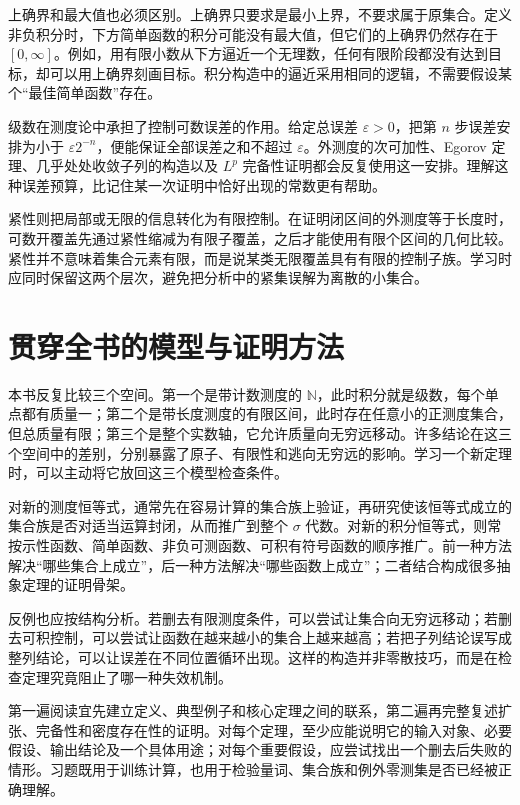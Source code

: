 上确界和最大值也必须区别。上确界只要求是最小上界，不要求属于原集合。定义非负积分时，下方简单函数的积分可能没有最大值，但它们的上确界仍然存在于 $[0,\infty]$。例如，用有限小数从下方逼近一个无理数，任何有限阶段都没有达到目标，却可以用上确界刻画目标。积分构造中的逼近采用相同的逻辑，不需要假设某个“最佳简单函数”存在。

级数在测度论中承担了控制可数误差的作用。给定总误差 $\varepsilon>0$，把第 $n$ 步误差安排为小于 $\varepsilon2^{-n}$，便能保证全部误差之和不超过 $\varepsilon$。外测度的次可加性、Egorov 定理、几乎处处收敛子列的构造以及 $L^p$ 完备性证明都会反复使用这一安排。理解这种误差预算，比记住某一次证明中恰好出现的常数更有帮助。

紧性则把局部或无限的信息转化为有限控制。在证明闭区间的外测度等于长度时，可数开覆盖先通过紧性缩减为有限子覆盖，之后才能使用有限个区间的几何比较。紧性并不意味着集合元素有限，而是说某类无限覆盖具有有限的控制子族。学习时应同时保留这两个层次，避免把分析中的紧集误解为离散的小集合。

\section{贯穿全书的模型与证明方法}
本书反复比较三个空间。第一个是带计数测度的 $\mathbb N$，此时积分就是级数，每个单点都有质量一；第二个是带长度测度的有限区间，此时存在任意小的正测度集合，但总质量有限；第三个是整个实数轴，它允许质量向无穷远移动。许多结论在这三个空间中的差别，分别暴露了原子、有限性和逃向无穷远的影响。学习一个新定理时，可以主动将它放回这三个模型检查条件。

对新的测度恒等式，通常先在容易计算的集合族上验证，再研究使该恒等式成立的集合族是否对适当运算封闭，从而推广到整个 $\sigma$ 代数。对新的积分恒等式，则常按示性函数、简单函数、非负可测函数、可积有符号函数的顺序推广。前一种方法解决“哪些集合上成立”，后一种方法解决“哪些函数上成立”；二者结合构成很多抽象定理的证明骨架。

反例也应按结构分析。若删去有限测度条件，可以尝试让集合向无穷远移动；若删去可积控制，可以尝试让函数在越来越小的集合上越来越高；若把子列结论误写成整列结论，可以让误差在不同位置循环出现。这样的构造并非零散技巧，而是在检查定理究竟阻止了哪一种失效机制。

第一遍阅读宜先建立定义、典型例子和核心定理之间的联系，第二遍再完整复述扩张、完备性和密度存在性的证明。对每个定理，至少应能说明它的输入对象、必要假设、输出结论及一个具体用途；对每个重要假设，应尝试找出一个删去后失败的情形。习题既用于训练计算，也用于检验量词、集合族和例外零测集是否已经被正确理解。

